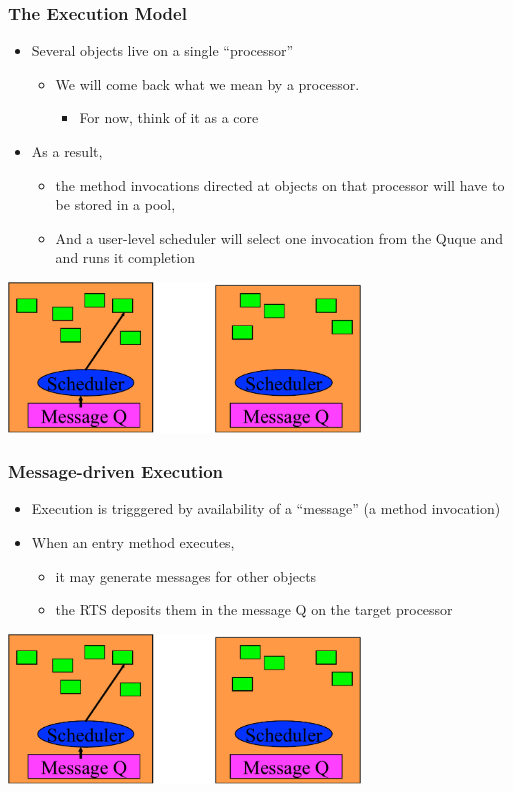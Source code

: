 \begin{frame}[t]
\frametitle{The Execution Model}
  \begin{itemize}
    \item Several objects live on a single ``processor”
    \begin{itemize}
      \item We will come back what we mean by a processor.
      \begin{itemize}
        \item For now, think of it as a core
      \end{itemize}
    \end{itemize}
  \item As a result, 
    \begin{itemize}
      \item the method invocations directed at objects on that processor will have to be stored in a pool,
      \item And a user-level scheduler will select one invocation from the Quque and and runs it completion
    \end{itemize}
  \end{itemize}
  \begin{center} \includegraphics[width=0.7\textwidth]{figures/scheduler} \end{center}
\end{frame}

\begin{frame}[t]
\frametitle{Message-driven Execution}
  \begin{itemize}
    \item Execution is trigggered by availability of a ``message” (a method invocation)
    \item When an entry method executes, 
    \begin{itemize}
      \item it may generate messages for other objects
      \item the RTS deposits them in the message Q on the target processor
    \end{itemize}
  \end{itemize}
  \begin{center} \includegraphics[width=0.7\textwidth]{figures/scheduler} \end{center}
\end{frame}

